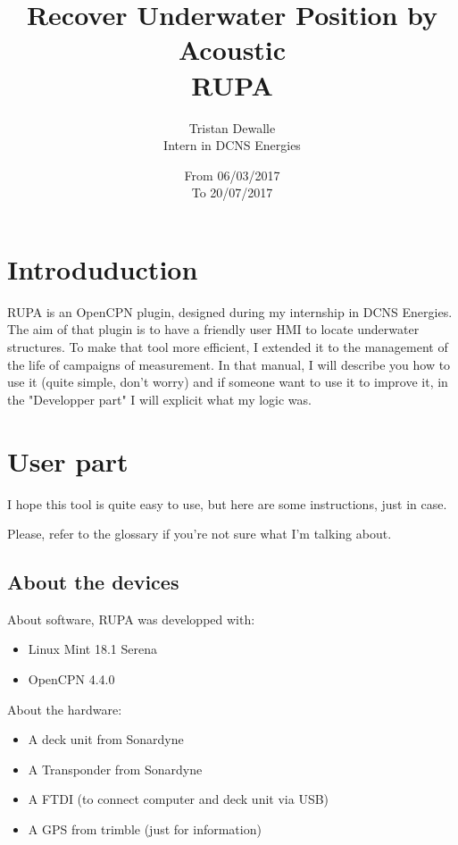 \documentclass[11pt]{report}
\title{Recover Underwater Position by Acoustic \\ RUPA}
\author{Tristan Dewalle \\ Intern in DCNS Energies}
\date{From 06/03/2017\\To 20/07/2017}
\begin{document}
    \maketitle
	\tableofcontents
	\chapter{Introduduction}
	 RUPA is an OpenCPN plugin, designed during my internship in DCNS Energies. The aim of that plugin is to 
	 have a friendly user HMI to locate underwater structures. To make that tool more efficient, I extended it 
	 to the management of the life of campaigns of measurement. In that manual, I will describe you how to use it
	 (quite simple, don't worry) and if someone want to use it to improve it, in the "Developper part" I will 
	 explicit what my logic was.

	\chapter{User part}
	    I hope this tool is quite easy to use, but here are some instructions, just in case.

	    Please, refer to the glossary if you're not sure what I'm talking about.
	    \section{About the devices }
		About software, RUPA was developped with:
		\begin{itemize}
		    \item Linux Mint 18.1 Serena
		    \item OpenCPN 4.4.0
		\end{itemize}

		 About the hardware: 
		\begin{itemize}
		    \item A deck unit from Sonardyne
		    \item A Transponder from Sonardyne
		    \item A FTDI (to connect computer and deck unit via USB)
		    \item A GPS from trimble (just for information)
		\end{itemize}
\end{document}
